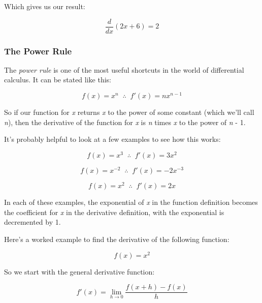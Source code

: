 \documentclass[11pt]{article}
\begin{document}
Which gives us our result:

\begin{equation}\frac{d}{dx}(2x + 6) = 2\end{equation}

\subsubsection{The Power Rule}\label{the-power-rule}

The \emph{power rule} is one of the most useful shortcuts in the world
of differential calculus. It can be stated like this:

\begin{equation}f(x) = x^{n} \;\; \therefore \;\; f'(x) = nx^{n-1}\end{equation}

So if our function for \emph{x} returns \emph{x} to the power of some
constant (which we'll call \emph{n}), then the derivative of the
function for \emph{x} is \emph{n} times \emph{x} to the power of
\emph{n} - 1.

It's probably helpful to look at a few examples to see how this works:

\begin{equation}f(x) = x^{3} \;\; \therefore \;\; f'(x) = 3x^{2}\end{equation}

\begin{equation}f(x) = x^{-2} \;\; \therefore \;\; f'(x) = -2x^{-3}\end{equation}

\begin{equation}f(x) = x^{2} \;\; \therefore \;\; f'(x) = 2x\end{equation}

In each of these examples, the exponential of \emph{x} in the function
definition becomes the coefficient for \emph{x} in the derivative
definition, with the exponential is decremented by 1.

Here's a worked example to find the derivative of the following
function:

\begin{equation}f(x) = x^{2}\end{equation}

So we start with the general derivative function:

\begin{equation}f'(x) = \lim_{h \to 0} \frac{f(x + h) - f(x)}{h} \end{equation}
\end{document}
